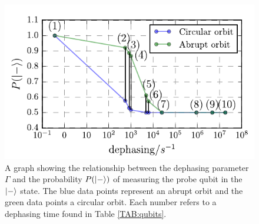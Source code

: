 \begin{figure}[h]
	\centering
	\includegraphics[width=1.05\linewidth]{../Figures/dephasing.pdf}
		\caption{A graph showing the relationship between the dephasing parameter $\Gamma$ and the probability $P(\ket{-})$ of measuring the probe qubit in the $\ket{-}$ state.  The blue data points represent an abrupt orbit and the green data points a circular orbit. Each number refers to a dephasing time found in Table \ref{TAB:qubits}. }
		\label{fig:dephasingplot}
\end{figure}





